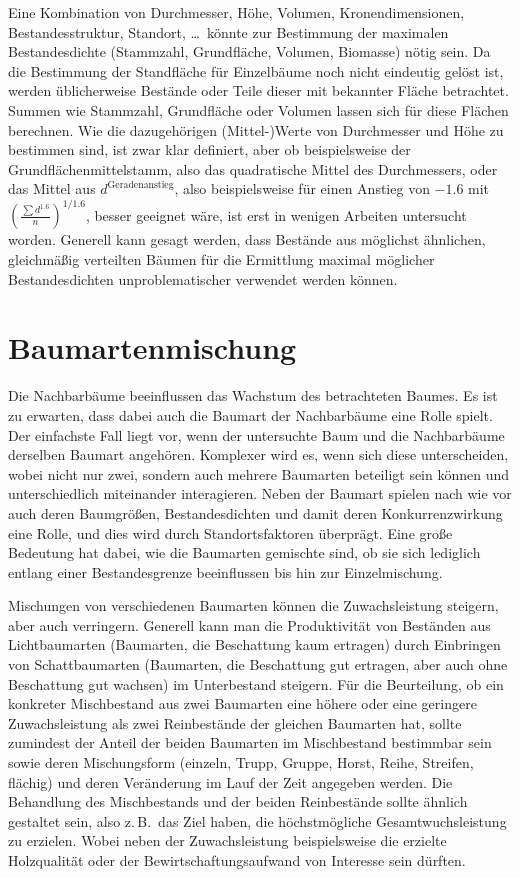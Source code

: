 \documentclass[twocolumn, paper=a4, fontsize=10pt]{scrartcl}
\begin{document}
Eine Kombination von Durchmesser, Höhe, Volumen, Kronendimensionen,
Bestandesstruktur, Standort, \dots\ könnte zur Bestimmung der maximalen
Bestandesdichte (Stammzahl, Grundfläche, Volumen, Biomasse) nötig sein. Da die
Bestimmung der Standfläche für Einzelbäume noch nicht eindeutig gelöst ist,
werden üblicherweise Bestände oder Teile dieser mit bekannter Fläche
betrachtet. Summen wie Stammzahl, Grundfläche oder Volumen lassen sich für diese
Flächen berechnen. Wie die dazugehörigen (Mittel-)Werte von Durchmesser und
Höhe zu bestimmen sind, ist zwar klar definiert, aber ob beispielsweise der
Grundflächenmittelstamm, also das quadratische Mittel des Durchmessers, oder das
Mittel aus $d^{\text{Geradenanstieg}}$, also beispielsweise für einen Anstieg von
$-1.6$ mit $\left(\frac{\sum d^{1.6}}{n}\right)^{1/1.6}$, besser
geeignet wäre, ist erst in wenigen Arbeiten untersucht worden. Generell kann
gesagt werden, dass Bestände aus möglichst ähnlichen, gleichmäßig verteilten
Bäumen für die Ermittlung maximal möglicher Bestandesdichten unproblematischer
verwendet werden können.

\section{Baumartenmischung}

Die Nachbarbäume beeinflussen das Wachstum des betrachteten Baumes. Es ist zu
erwarten, dass dabei auch die Baumart der Nachbarbäume eine Rolle spielt. Der
einfachste Fall liegt vor, wenn der untersuchte Baum und die Nachbarbäume derselben
Baumart angehören. Komplexer wird es, wenn sich diese unterscheiden, wobei nicht
nur zwei, sondern auch mehrere Baumarten beteiligt sein können und unterschiedlich
miteinander interagieren. Neben der Baumart spielen nach wie vor auch deren
Baumgrößen, Bestandesdichten und damit deren Konkurrenzwirkung eine Rolle, und
dies wird durch Standortsfaktoren überprägt. Eine große Bedeutung hat dabei,
wie die Baumarten gemischte sind, ob sie sich lediglich entlang einer Bestandesgrenze
beeinflussen bis hin zur Einzelmischung.

Mischungen von verschiedenen Baumarten können die Zuwachsleistung steigern, aber
auch verringern. Generell kann man die Produktivität von Beständen aus
Lichtbaumarten (Baumarten, die Beschattung kaum ertragen) durch Einbringen von
Schattbaumarten (Baumarten, die Beschattung gut ertragen, aber auch ohne
Beschattung gut wachsen) im Unterbestand steigern. Für die Beurteilung, ob ein
konkreter Mischbestand aus zwei Baumarten eine höhere oder eine geringere
Zuwachsleistung als zwei Reinbestände der gleichen Baumarten hat, sollte
zumindest der Anteil der beiden Baumarten im Mischbestand bestimmbar sein sowie
deren Mischungsform (einzeln, Trupp, Gruppe, Horst, Reihe, Streifen, flächig)
und deren Veränderung im Lauf der Zeit angegeben werden. Die Behandlung des
Mischbestands und der beiden Reinbestände sollte ähnlich gestaltet sein, also
z.\,B.\ das Ziel haben, die höchstmögliche Gesamtwuchsleistung zu erzielen. Wobei
neben der Zuwachsleistung beispielsweise die erzielte Holzqualität oder der
Bewirtschaftungsaufwand von Interesse sein dürften.

\printindex
\printbibliography[heading=bibintoc, title={Literatur}]

\end{document}
